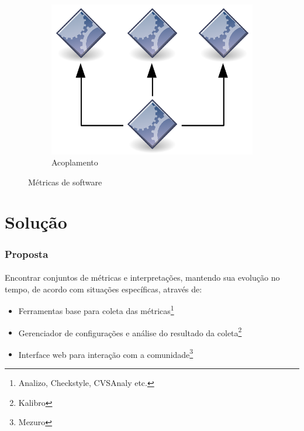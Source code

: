 \documentclass{beamer}
\begin{document}
\begin{frame}
\begin{figure}
\begin{subfigure}[b]{0.3\textwidth}
      \includegraphics[width=\textwidth]{images/coupling.png}
                \caption*{Acoplamento}
                
        \end{subfigure}
        \caption{Métricas de software}\label{fig:animals}
\end{figure}

\end{frame}

\section{Solução}
  
\begin{frame}
  \frametitle{Proposta}
  \framesubtitle{}
  
  Encontrar conjuntos de métricas e interpretações, mantendo sua evolução no tempo, de acordo com situações específicas, através de:
  \begin{itemize}
    \item Ferramentas base para coleta das métricas\footnote{Analizo, Checkstyle, CVSAnaly etc.}
    \item Gerenciador de configurações e análise do resultado da coleta\footnote{Kalibro}
    \item Interface web para interação com a comunidade\footnote{Mezuro}
  \end{itemize}
  

\end{frame}
\end{document}
